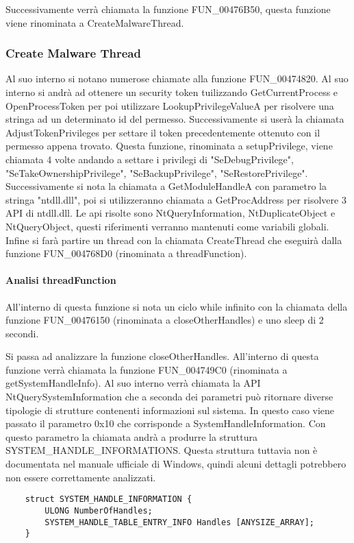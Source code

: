 \documentclass[]{article}
\begin{document}
Successivamente verrà chiamata la funzione FUN\_00476B50, questa funzione viene rinominata a CreateMalwareThread. 

\subsubsection{Create Malware Thread}
Al suo interno si notano numerose chiamate alla funzione FUN\_00474820. Al suo interno si andrà ad ottenere un security token tuilizzando GetCurrentProcess e OpenProcessToken per poi utilizzare LookupPrivilegeValueA per risolvere una stringa ad un determinato id del permesso. Successivamente si userà la chiamata AdjustTokenPrivileges per settare il token precedentemente ottenuto con il permesso appena trovato. Questa funzione, rinominata a setupPrivilege, viene chiamata 4 volte andando a settare i privilegi di "SeDebugPrivilege", "SeTakeOwnershipPrivilege", "SeBackupPrivilege", "SeRestorePrivilege". Successivamente si nota la chiamata a GetModuleHandleA con parametro la stringa "ntdll.dll", poi si utilizzeranno chiamata a GetProcAddress per risolvere 3 API di ntdll.dll. Le api risolte sono NtQueryInformation, NtDuplicateObject e NtQueryObject, questi riferimenti verranno mantenuti come variabili globali. Infine si farà partire un thread con la chiamata CreateThread che eseguirà dalla funzione FUN\_004768D0 (rinominata a threadFunction).

\paragraph{Analisi threadFunction}
All'interno di questa funzione si nota un ciclo while infinito con la chiamata della funzione FUN\_00476150 (rinominata a closeOtherHandles) e uno sleep di 2 secondi.

Si passa ad analizzare la funzione closeOtherHandles. All'interno di questa funzione verrà chiamata la funzione FUN\_004749C0 (rinominata a getSystemHandleInfo). Al suo interno verrà chiamata la API NtQuerySystemInformation che a seconda dei parametri può ritornare diverse tipologie di strutture contenenti informazioni sul sistema. In questo caso viene passato il parametro 0x10 che corrisponde a SystemHandleInformation. Con questo parametro la chiamata andrà a produrre la struttura SYSTEM\_HANDLE\_INFORMATIONS. Questa struttura tuttavia non è documentata nel manuale ufficiale di Windows, quindi alcuni dettagli potrebbero non essere correttamente analizzati.
\begin{verbatim}
	struct SYSTEM_HANDLE_INFORMATION {
		ULONG NumberOfHandles;
		SYSTEM_HANDLE_TABLE_ENTRY_INFO Handles [ANYSIZE_ARRAY];
	}
\end{verbatim}
\end{document}
